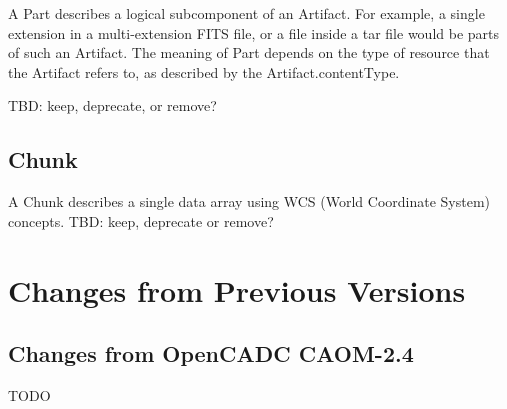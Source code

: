 \documentclass[11pt,a4paper]{ivoa}
\begin{document}
A Part describes a logical subcomponent of an Artifact. For example, a single 
extension in a multi-extension FITS file, or a file inside a tar file would be parts
of such an Artifact. The meaning of Part depends on the type of resource that the
Artifact refers to, as described by the Artifact.contentType.

TBD: keep, deprecate, or remove?

\subsection{Chunk}

A Chunk describes a single data array using WCS (World Coordinate System) concepts. 
TBD: keep, deprecate or remove?



\appendix
\section{Changes from Previous Versions}

\subsection{Changes from OpenCADC CAOM-2.4}

TODO



\end{document}
